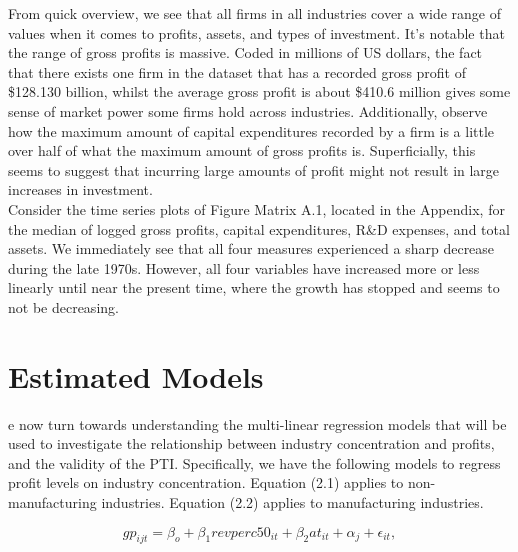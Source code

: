 From quick overview, we see that all firms in all industries cover a wide range of values when it comes to profits, assets, and types of investment. It’s notable that the range of gross profits is massive. Coded in millions of US dollars, the fact that there exists one firm in the dataset that has a recorded gross profit of \$128.130 billion, whilst the average gross profit is about \$410.6 million gives some sense of market power some firms hold across industries. Additionally, observe how the maximum amount of capital expenditures recorded by a firm is a little over half of what the maximum amount of gross profits is. Superficially, this seems to suggest that incurring large amounts of profit might not result in large increases in investment. \\

Consider the time series plots of Figure Matrix A.1, located in the Appendix, for the median of logged gross profits, capital expenditures, R\&D expenses, and total assets. We immediately see that all four measures experienced a sharp decrease during the late 1970s. However, all four variables have increased more or less linearly until near the present time, where the growth has stopped and seems to not be decreasing.


\section{Estimated Models}
\label{sec:sec04}

e now turn towards understanding the multi-linear regression models that will be used to investigate the relationship between industry concentration and profits, and the validity of the PTI. Specifically, we have the following models to regress profit levels on industry concentration. Equation (2.1) applies to non-manufacturing industries. Equation (2.2) applies to manufacturing industries.

\iffalse
\begin{equation}
	gp_{ijt} = \beta_{o} + \beta_{1}revperc50_{it} + \beta_{2}at_{it} + \beta_{3}gp_{it - 1} + \alpha_{j} + \gamma_{t} + \epsilon_{it},
\end{equation}
\fi

\begin{equation}
	gp_{ijt} = \beta_{o} + \beta_{1}revperc50_{it} + \beta_{2}at_{it} + \alpha_{j} + \epsilon_{it},
\end{equation}

